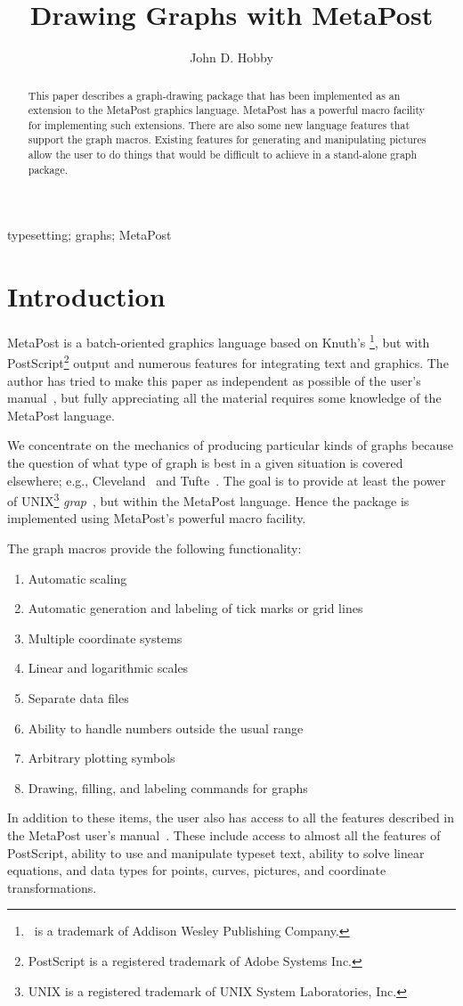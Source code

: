 \documentclass{article} %
\author{John D. Hobby}
\title{Drawing Graphs with {MetaPost}}
\date{}
\newcommand\myabstract{%
This paper describes a graph-drawing package that has been implemented
as an extension to the MetaPost graphics language.  MetaPost has
a powerful macro facility for implementing such extensions.  There are
also some new language features that support the graph macros.
Existing features for generating and manipulating pictures
allow the user to do things that would be difficult to achieve
in a stand-alone graph package.}
\newcommand\mykeywords{%
    typesetting; graphs; MetaPost}
\begin{document}
  \maketitle
  \begin{abstract} \myabstract \end{abstract}
  \ifx\keywords\undefined \else
    \begin{keywords} \mykeywords \end{keywords}
  \fi

\setlength{\columnsep}{2.5em}
\begin{multicols}{2}
\tableofcontents
\end{multicols}

\section{Introduction}
\label{intro}

MetaPost is a batch-oriented graphics language based on Knuth's \MF\footnote{\MF\
is a trademark of Addison Wesley Publishing Company.}, but with
PostScript\footnote{PostScript is a registered trademark of Adobe Systems Inc.}
output and numerous features for integrating text and graphics.
The author has tried to make this paper as independent as possible of the
user's manual~\cite{ho:mp3}, but fully appreciating all the material requires
some knowledge of the MetaPost language.

We concentrate on the mechanics of producing particular kinds of graphs
because the question of what type of graph is best in a given situation
is covered elsewhere; e.g., Cleveland~\cite{Cleve85,Cleve93,Cleve93a} and
Tufte~\cite{Tufte83}.
The goal is to provide at least the power of UNIX\footnote{UNIX is a registered
trademark of UNIX System Laboratories, Inc.} {\it
grap\/}~\cite{BenKer90}, but within the MetaPost language.
Hence the package is implemented using MetaPost's powerful macro facility.

The graph macros provide the following functionality:
\begin{enumerate}
\item Automatic scaling
\item Automatic generation and labeling of tick marks or grid lines
\item Multiple coordinate systems
\item Linear and logarithmic scales
\item Separate data files
\item Ability to handle numbers outside the usual range
\item Arbitrary plotting symbols
\item Drawing, filling, and labeling commands for graphs
\end{enumerate}
In addition to these items, the user also has access to all the features
described in the MetaPost user's manual~\cite{ho:mp3}.
These include access to almost all the features of PostScript,
ability to use and manipulate typeset text,
ability to solve linear equations,
and data types for points, curves, pictures, and coordinate transformations.
\end{document}
